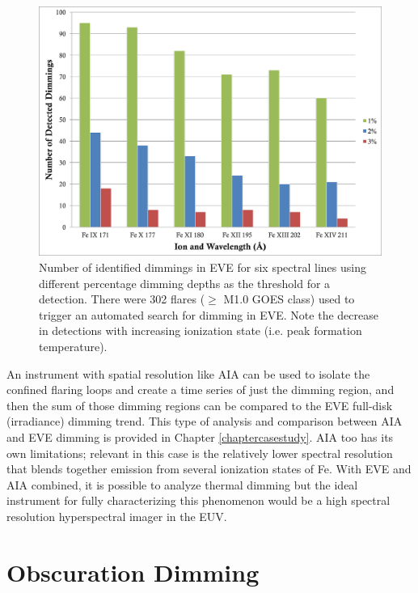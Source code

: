 \begin{figure}[!h]
    \begin{center}
        \includegraphics[width=150mm]{Images/DetectedDimmingVsIonization.png}
    \end{center}
    \caption[Dimming dependence on temperature in EVE]{
        Number of identified dimmings in EVE for six spectral lines using different percentage dimming depths as the
        threshold for a detection. There were 302 flares ($\geq$ M1.0 GOES class) used to trigger an automated search for 
        dimming in EVE. 
        Note the decrease in detections with increasing ionization state (i.e. peak formation temperature).
    }
    \label{detectedDimmingVsIonization}
\end{figure}

An instrument with spatial resolution like AIA can be used to isolate the confined flaring loops and create a time series of just the dimming region, and then the sum of those dimming regions can be compared to the EVE full-disk (irradiance) dimming trend. This type of analysis and comparison between AIA and EVE dimming is provided in Chapter \ref{chaptercasestudy}. AIA too has its own limitations; relevant in this case is the relatively lower spectral resolution that blends together emission from several ionization states of Fe. With EVE and AIA combined, it is possible to analyze thermal dimming but the ideal instrument for fully characterizing this phenomenon would be a high spectral resolution hyperspectral imager in the EUV.

\section{Obscuration Dimming}


